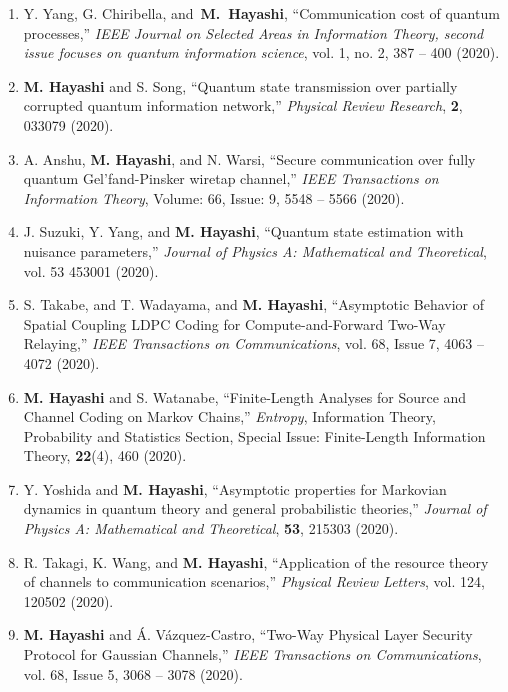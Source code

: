\documentclass[a4paper,12pt,oneside]{article}
\begin{document}
\begin{enumerate}
\item  
Y. Yang, G. Chiribella,  and~\textbf{M.~Hayashi},
``Communication cost of quantum processes,''
{\em IEEE Journal on Selected Areas in Information Theory, second issue focuses on quantum information science},
vol. 1, no. 2, 387 -- 400 (2020).
 
\item  
\textbf{M. Hayashi} and S. Song,
``Quantum state transmission over partially corrupted quantum information network,''
{\em Physical Review Research},  {\bf 2}, 033079 (2020).

\item  
A. Anshu, \textbf{M. Hayashi}, and N. Warsi,   
``Secure communication over fully quantum Gel'fand-Pinsker wiretap channel,''
{\em IEEE Transactions on Information Theory}, 
Volume: 66, Issue: 9, 5548 -- 5566 (2020). 

\item  
J. Suzuki, Y. Yang, and \textbf{M. Hayashi},
``Quantum state estimation with nuisance parameters,'' 
{\em Journal of Physics A: Mathematical and Theoretical}, 
vol. 53 453001 (2020). 

\item  
S. Takabe, and T. Wadayama, and \textbf{M. Hayashi}, 
``Asymptotic Behavior of Spatial Coupling LDPC Coding for Compute-and-Forward Two-Way Relaying,''
{\em IEEE Transactions on Communications},
vol. 68, Issue 7, 4063 -- 4072 (2020).

\item  
\textbf{M. Hayashi} and S. Watanabe,
``Finite-Length Analyses for Source and Channel Coding on Markov Chains,'' 
{\em Entropy}, Information Theory, Probability and Statistics Section, Special Issue: Finite-Length Information Theory,  
{\bf 22}(4), 460 (2020).

\item  
Y. Yoshida and \textbf{M. Hayashi},
``Asymptotic properties for Markovian dynamics in quantum theory and general probabilistic theories,'' 
{\em Journal of Physics A: Mathematical and Theoretical}, 
{\bf 53}, 215303 (2020).

\item  
R. Takagi, K. Wang, and \textbf{M. Hayashi},
``Application of the resource theory of channels to communication scenarios,'' 
{\em Physical Review Letters}, 
vol. 124, 120502 (2020).

\item  
\textbf{M. Hayashi} and \'{A}. V\'{a}zquez-Castro,
``Two-Way Physical Layer Security Protocol for Gaussian Channels,'' 
{\em IEEE Transactions on Communications},
vol. 68, Issue 5, 3068 -- 3078 (2020).


\end{enumerate}
\end{document}
